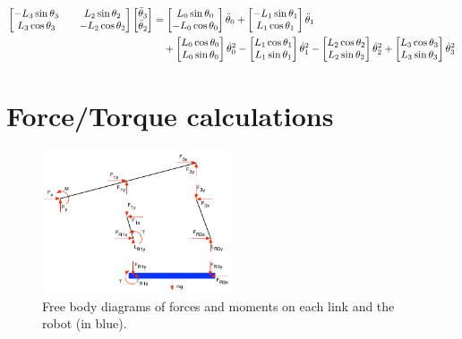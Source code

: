 \documentclass[letterpaper]{article}
\begin{document}
\begin{align}
	\begin{bmatrix} -L_3 \sin \theta_3 && L_2 \sin \theta_2 \\ L_3 \cos \theta_3 && -L_2 \cos \theta_2 \end{bmatrix} \begin{bmatrix} \ddot{\theta}_3 \\ \ddot{\theta}_2 \end{bmatrix} &= \begin{bmatrix} L_0 \sin \theta_0 \\ - L_0 \cos \theta_0 \end{bmatrix} \ddot{\theta}_0 + \begin{bmatrix} -L_1 \sin \theta_1 \\ L_1 \cos \theta_1 \end{bmatrix} \ddot{\theta}_1 \notag \\
		& \quad + \begin{bmatrix} L_0 \cos \theta_0 \\ L_0 \sin \theta_0 \end{bmatrix} \dot{\theta}_0^2- \begin{bmatrix} L_1 \cos \theta_1 \\ L_1 \sin \theta_1 \end{bmatrix} \dot{\theta}_1^2 - \begin{bmatrix} L_2 \cos \theta_2 \\ L_2 \sin \theta_2 \end{bmatrix} \dot{\theta}_2^2 + \begin{bmatrix} L_3 \cos \theta_3 \\ L_3 \sin \theta_3 \end{bmatrix} \dot{\theta}_3^2
\end{align}

\section{Force/Torque calculations}

\begin{figure}[htb]
	\centering
	\includegraphics[width = 0.5\textwidth]{FB.pdf}
	\caption{Free body diagrams of forces and moments on each link and the robot (in blue).}
	\label{fig:FB}
\end{figure}
\end{document}
